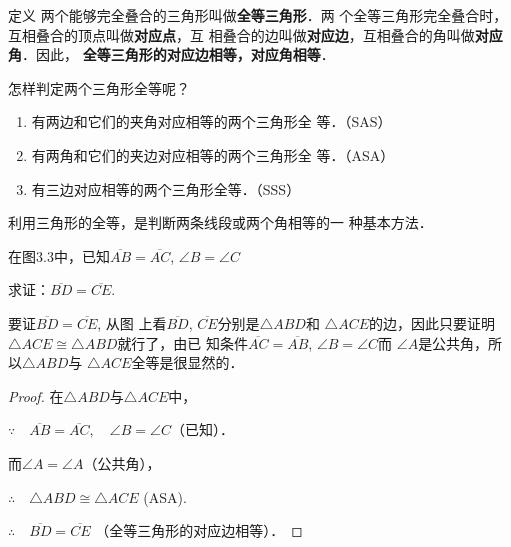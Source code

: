 \begin{figure}[htp]
    \centering
{}
    \caption{}
\end{figure}

\begin{blk}{定义}
两个能够完全叠合的三角形叫做\textbf{全等三角形}．两
个全等三角形完全叠合时，互相叠合的顶点叫做\textbf{对应点}，互
相叠合的边叫做\textbf{对应边}，互相叠合的角叫做\textbf{对应角}．因此，
\textbf{全等三角形的对应边相等，对应角相等}．
\end{blk}
 
怎样判定两个三角形全等呢？
\begin{enumerate}
\item 有两边和它们的夹角对应相等的两个三角形全
等．（SAS）
\item 有两角和它们的夹边对应相等的两个三角形全
等．（ASA）
\item 有三边对应相等的两个三角形全等．（SSS）
\end{enumerate}

利用三角形的全等，是判断两条线段或两个角相等的一
种基本方法．

\begin{example}
    在图3.3中，已知$\overline{AB}=\overline{AC}$, $\angle B=\angle C$
    
    求证：$\overline{BD}=\overline{CE}$.
\end{example}



\begin{analyze}
    要证$\overline{BD}=\overline{CE}$, 从图
上看$\overline{BD}$, $\overline{CE}$分别是$\triangle ABD$和
$\triangle ACE$的边，因此只要证明
$\triangle ACE \cong \triangle ABD$就行了，由已
知条件$\overline{AC}=\overline{AB}$, $\angle B=\angle C$而
$\angle A$是公共角，所以$\triangle ABD$与
$\triangle ACE$全等是很显然的．
\end{analyze}

\begin{proof}
在$\triangle ABD$与$\triangle ACE$中，

$\because\quad \overline{AB}=\overline{AC},\quad \angle B=\angle C$（已知）．

而$\angle A=\angle A$（公共角），

$\therefore\quad \triangle ABD\cong \triangle ACE$ (ASA).

$\therefore\quad \overline{BD}=\overline{CE}$ （全等三角形的对应边相等）．
\end{proof}    


